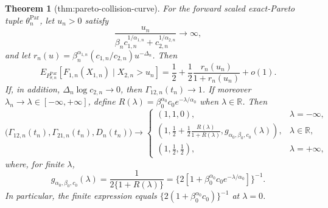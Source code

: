 \documentclass{article}
\newtheorem{theorem}{Theorem}
\begin{document}
\begin{theorem}[thm:pareto-collision-curve]\label{thm:pareto-collision-curve}
For the forward scaled exact-Pareto tuple \(\theta_n^{\mathrm{Par}}\), let \(u_n>0\) satisfy
\[
\frac{u_n}{\beta_n c_{1,n}^{1/\alpha_{1,n}}+c_{2,n}^{1/\alpha_{2,n}}}\to\infty,
\]
and let \(r_n(u)=\beta_n^{\alpha_{1,n}}(c_{1,n}/c_{2,n})u^{-\Delta_n}\). Then
\[
E_{P_{\theta,n}^{\mathrm{Par}}}[F_{1,n}(X_{1,n})\mid X_{2,n}>u_n]
=\frac12+\frac12\frac{r_n(u_n)}{1+r_n(u_n)}+o(1).
\]
If, in addition, \(\Delta_n\log c_{2,n}\to0\), then \(\Gamma_{12,n}(t_n)\to1\). If moreover \(\lambda_n\to\lambda\in[-\infty,+\infty]\), define \(R(\lambda)=\beta_0^{\alpha_0}c_0e^{-\lambda/\alpha_0}\) when \(\lambda\in\mathbb R\). Then
\[
\bigl(\Gamma_{12,n}(t_n),\Gamma_{21,n}(t_n),D_n(t_n)\bigr)
\longrightarrow
\begin{cases}
(1,1,0), & \lambda=-\infty,\\
\displaystyle\left(1,\frac12+\frac12\frac{R(\lambda)}{1+R(\lambda)},
g_{\alpha_0,\beta_0,c_0}(\lambda)\right), & \lambda\in\mathbb R,\\
\displaystyle\left(1,\frac12,\frac12\right), & \lambda=+\infty,
\end{cases}
\]
where, for finite \(\lambda\),
\[
g_{\alpha_0,\beta_0,c_0}(\lambda)
=\frac{1}{2\{1+R(\lambda)\}}
=\{2[1+\beta_0^{\alpha_0}c_0e^{-\lambda/\alpha_0}]\}^{-1}.
\]
In particular, the finite expression equals \(\{2(1+\beta_0^{\alpha_0}c_0)\}^{-1}\) at \(\lambda=0\).
\end{theorem}
\end{document}
